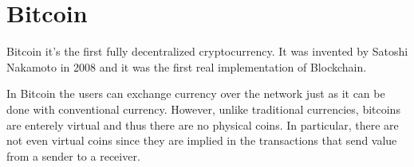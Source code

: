 \section{Bitcoin}
Bitcoin it's the first fully decentralized cryptocurrency. It was invented by
Satoshi Nakamoto in 2008 and it was the first real implementation of Blockchain.

In Bitcoin the users can exchange currency over the network just as it can be
done with conventional currency. However, unlike traditional currencies, bitcoins
are enterely virtual and thus there are no physical coins. In particular, there
are not even virtual coins since they are implied in the transactions that send
value from a sender to a receiver. 
